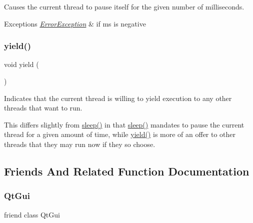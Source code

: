 Causes the current thread to pause itself for the given number of milliseconds. 


\begin{DoxyExceptions}{Exceptions}
{\em \mbox{\hyperlink{classErrorException}{Error\+Exception}}} & if ms is negative \\
\hline
\end{DoxyExceptions}
\mbox{\label{classGThread_a58c8b2ad0ea491a6642e5e1cbd358c89}} 
\subsubsection{\texorpdfstring{yield()}{yield()}}
{\footnotesize\ttfamily void yield (\begin{DoxyParamCaption}{ }\end{DoxyParamCaption})\hspace{0.3cm}{\ttfamily [static]}}



Indicates that the current thread is willing to yield execution to any other threads that want to run. 

This differs slightly from \mbox{\hyperlink{classGThread_aa3381590c1ef33c08000c2fbb2bf0dd0}{sleep()}} in that \mbox{\hyperlink{classGThread_aa3381590c1ef33c08000c2fbb2bf0dd0}{sleep()}} mandates to pause the current thread for a given amount of time, while \mbox{\hyperlink{classGThread_a58c8b2ad0ea491a6642e5e1cbd358c89}{yield()}} is more of an offer to other threads that they may run now if they so choose. 

\subsection{Friends And Related Function Documentation}
\mbox{\label{classGThread_a78e6068a40352424a09cd3753706c619}} 
\subsubsection{\texorpdfstring{Qt\+Gui}{QtGui}}
{\footnotesize\ttfamily friend class Qt\+Gui\hspace{0.3cm}{\ttfamily [friend]}}

\mbox{\label{classGThread_a4f1fcd681e2cf92d1b04e5e8a33dbe47}} 
